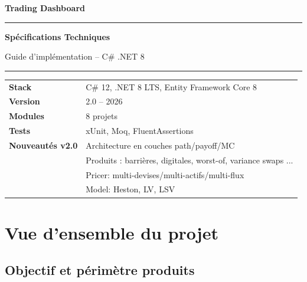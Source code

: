 \documentclass[a4paper,11pt]{article}
\begin{document}
\begin{titlepage}
\centering
\vspace*{2cm}
{\huge\bfseries\color{navy} Trading Dashboard\par}

\vspace{1.2cm}
\noindent\rule{\textwidth}{1.5pt}
\vspace{0.5cm}
{\LARGE\bfseries\color{navy} Sp\'ecifications Techniques\par}
\vspace{0.3cm}
{\large\color{cgray} Guide d'impl\'ementation -- C\# .NET 8\par}
\vspace{0.5cm}
\noindent\rule{\textwidth}{1.5pt}



\vspace{3cm}
\begin{tabular}{ll}
\toprule
\textbf{Stack}    & C\# 12, .NET 8 LTS, Entity Framework Core 8 \\
\textbf{Version}  & 2.0 -- 2026 \\
\textbf{Modules}  & 8 projets \\
\textbf{Tests}    & xUnit, Moq, FluentAssertions \\
\midrule
\textbf{Nouveaut\'es v2.0} & Architecture en couches path/payoff/MC \\
& Produits : barrières, digitales, worst-of, variance swaps ...\\
& Pricer: multi-devises/multi-actifs/multi-flux \\
& Model: Heston, LV, LSV \\
\bottomrule
\end{tabular}
\end{titlepage}

\tableofcontents
\newpage

\section{Vue d'ensemble du projet}

\subsection{Objectif et p\'erim\`etre produits}
\end{document}
